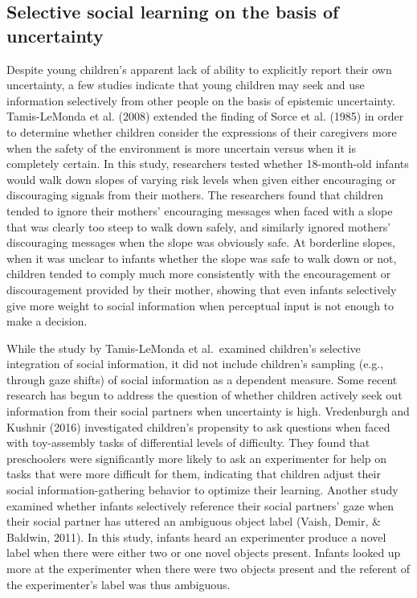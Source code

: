 \documentclass[,man,floatsintext]{apa6}
\begin{document}
\hypertarget{selective-social-learning-on-the-basis-of-uncertainty}{%
\subsection{Selective social learning on the basis of uncertainty}\label{selective-social-learning-on-the-basis-of-uncertainty}}

Despite young children's apparent lack of ability to explicitly report their own uncertainty, a few studies indicate that young children may seek and use information selectively from other people on the basis of epistemic uncertainty. Tamis-LeMonda et al. (2008) extended the finding of Sorce et al. (1985) in order to determine whether children consider the expressions of their caregivers more when the safety of the environment is more uncertain versus when it is completely certain. In this study, researchers tested whether 18-month-old infants would walk down slopes of varying risk levels when given either encouraging or discouraging signals from their mothers. The researchers found that children tended to ignore their mothers' encouraging messages when faced with a slope that was clearly too steep to walk down safely, and similarly ignored mothers' discouraging messages when the slope was obviously safe. At borderline slopes, when it was unclear to infants whether the slope was safe to walk down or not, children tended to comply much more consistently with the encouragement or discouragement provided by their mother, showing that even infants selectively give more weight to social information when perceptual input is not enough to make a decision.

While the study by Tamis-LeMonda et al.~examined children's selective integration of social information, it did not include children's sampling (e.g., through gaze shifts) of social information as a dependent measure. Some recent research has begun to address the question of whether children actively seek out information from their social partners when uncertainty is high. Vredenburgh and Kushnir (2016) investigated children's propensity to ask questions when faced with toy-assembly tasks of differential levels of difficulty. They found that preschoolers were significantly more likely to ask an experimenter for help on tasks that were more difficult for them, indicating that children adjust their social information-gathering behavior to optimize their learning. Another study examined whether infants selectively reference their social partners' gaze when their social partner has uttered an ambiguous object label (Vaish, Demir, \& Baldwin, 2011). In this study, infants heard an experimenter produce a novel label when there were either two or one novel objects present. Infants looked up more at the experimenter when there were two objects present and the referent of the experimenter's label was thus ambiguous.
\end{document}
